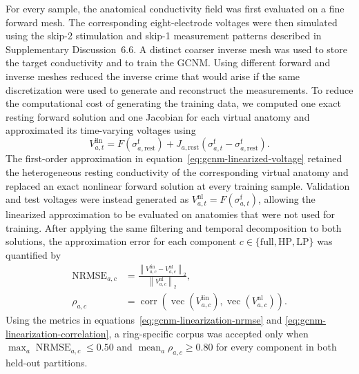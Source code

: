 \documentclass[11pt]{article}
\begin{document}
For every sample, the anatomical conductivity field was first evaluated on a fine forward mesh.
The corresponding eight-electrode voltages were then simulated using the skip-2 stimulation and skip-1 measurement patterns described in Supplementary Discussion~6.6.
A distinct coarser inverse mesh was used to store the target conductivity and to train the GCNM.
Using different forward and inverse meshes reduced the inverse crime that would arise if the same discretization were used to generate and reconstruct the measurements.
To reduce the computational cost of generating the training data, we computed one exact resting forward solution and one Jacobian for each virtual anatomy and approximated its time-varying voltages using
\begin{equation}
    V^{\mathrm{lin}}_{a,t}
    =
    F\!\left(\sigma^{\mathrm f}_{a,\mathrm{rest}}\right)
    +J_{a,\mathrm{rest}}
    \left(
        \sigma^{\mathrm f}_{a,t}
        -\sigma^{\mathrm f}_{a,\mathrm{rest}}
    \right).
\label{eq:gcnm-linearized-voltage}
\end{equation}
The first-order approximation in equation~\eqref{eq:gcnm-linearized-voltage} retained the heterogeneous resting conductivity of the corresponding virtual anatomy and replaced an exact nonlinear forward solution at every training sample.
Validation and test voltages were instead generated as $V^{\mathrm{nl}}_{a,t}=F(\sigma^{\mathrm f}_{a,t})$, allowing the linearized approximation to be evaluated on anatomies that were not used for training.
After applying the same filtering and temporal decomposition to both solutions, the approximation error for each component $c\in\{\mathrm{full},\mathrm{HP},\mathrm{LP}\}$ was quantified by
\begin{subequations}
\label{eq:gcnm-linearization-metrics}
\begin{align}
    \operatorname{NRMSE}_{a,c}
    &=
    \frac{
        \left\|
            V^{\mathrm{lin}}_{a,c}
            -V^{\mathrm{nl}}_{a,c}
        \right\|_2
    }{
        \left\|V^{\mathrm{nl}}_{a,c}\right\|_2
    },
    \label{eq:gcnm-linearization-nrmse}\\
    \rho_{a,c}
    &=
    \operatorname{corr}\!\left(
        \operatorname{vec}\!\left(V^{\mathrm{lin}}_{a,c}\right),
        \operatorname{vec}\!\left(V^{\mathrm{nl}}_{a,c}\right)
    \right).
    \label{eq:gcnm-linearization-correlation}
\end{align}
\end{subequations}
Using the metrics in equations~\eqref{eq:gcnm-linearization-nrmse} and \eqref{eq:gcnm-linearization-correlation}, a ring-specific corpus was accepted only when $\max_a\operatorname{NRMSE}_{a,c}\leq0.50$ and $\operatorname{mean}_a\rho_{a,c}\geq0.80$ for every component in both held-out partitions.
\end{document}
